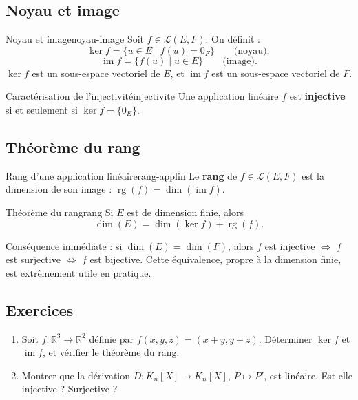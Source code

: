 \documentclass[theme=pringlea]{myrtille}
\begin{document}
\subsection{Noyau et image}
\begin{myrdef}{Noyau et image}{noyau-image}
Soit $f \in \mathcal{L}(E,F)$. On définit :
\[ \ker f = \{ u \in E \mid f(u) = 0_F \} \qquad \text{(noyau)}, \]
\[ \operatorname{im} f = \{ f(u) \mid u \in E \} \qquad \text{(image)}. \]
$\ker f$ est un sous-espace vectoriel de $E$, et $\operatorname{im} f$ est un sous-espace vectoriel de $F$.
\end{myrdef}

\begin{myrthm}{Caractérisation de l'injectivité}{injectivite}
Une application linéaire $f$ est \textbf{injective} si et seulement si $\ker f = \{0_E\}$.
\end{myrthm}

\subsection{Théorème du rang}
\begin{myrdef}{Rang d'une application linéaire}{rang-applin}
Le \textbf{rang} de $f \in \mathcal{L}(E,F)$ est la dimension de son image : $\operatorname{rg}(f) = \dim(\operatorname{im} f)$.
\end{myrdef}

\begin{myrthm}{Théorème du rang}{rang}
Si $E$ est de dimension finie, alors
\[ \dim(E) = \dim(\ker f) + \operatorname{rg}(f). \]
\end{myrthm}

\begin{infobox}
Conséquence immédiate : si $\dim(E) = \dim(F)$, alors $f$ est injective $\iff$ $f$ est surjective $\iff$ $f$ est bijective. Cette équivalence, propre à la dimension finie, est extrêmement utile en pratique.
\end{infobox}

\subsection{Exercices}
\begin{enumerate}
    \item Soit $f : \mathbb{R}^3 \to \mathbb{R}^2$ définie par $f(x,y,z) = (x+y, y+z)$. Déterminer $\ker f$ et $\operatorname{im} f$, et vérifier le théorème du rang.
    \item Montrer que la dérivation $D : K_n[X] \to K_n[X]$, $P \mapsto P'$, est linéaire. Est-elle injective ? Surjective ?
\end{enumerate}
\end{document}
